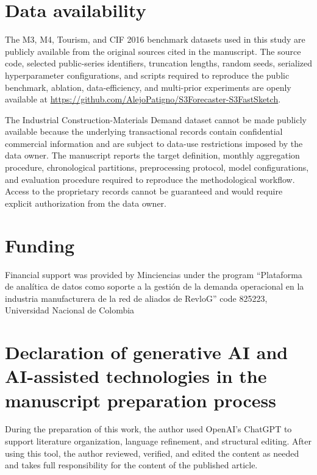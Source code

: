 \documentclass[review,number,sort&compress]{elsarticle}
\begin{document}
\section*{Data availability}

The M3, M4, Tourism, and CIF 2016 benchmark datasets used in this
study are publicly available from the original sources cited in the
manuscript. The source code, selected public-series identifiers,
truncation lengths, random seeds, serialized hyperparameter
configurations, and scripts required to reproduce the public benchmark,
ablation, data-efficiency, and multi-prior experiments are openly
available at \url{https://github.com/AlejoPatigno/S3Forecaster-S3FastSketch}.

The Industrial Construction-Materials Demand dataset cannot be made
publicly available because the underlying transactional records contain
confidential commercial information and are subject to data-use
restrictions imposed by the data owner. The manuscript reports the
target definition, monthly aggregation procedure, chronological
partitions, preprocessing protocol, model configurations, and evaluation
procedure required to reproduce the methodological workflow. Access to
the proprietary records cannot be guaranteed and would require explicit
authorization from the data owner.

\section*{Funding}

Financial support was provided by Minciencias under the program “Plataforma de analítica de datos como soporte a la gestión de la demanda operacional en la industria manufacturera de la red de aliados de RevloG” code 825223, Universidad Nacional de Colombia

\section*{Declaration of generative AI and AI-assisted technologies
in the manuscript preparation process}

During the preparation of this work, the author used OpenAI's ChatGPT
to support literature organization, language refinement, and structural
editing. After using this tool, the author reviewed, verified, and edited
the content as needed and takes full responsibility for the content of
the published article.
\end{document}
